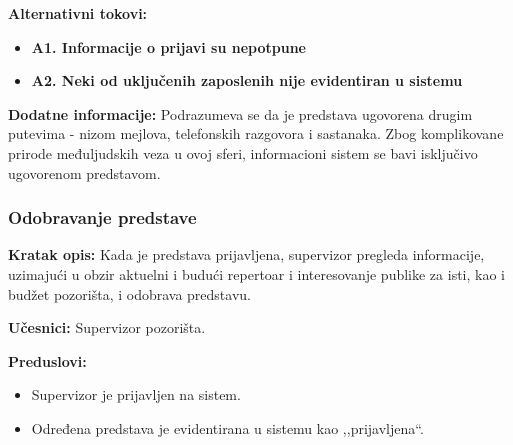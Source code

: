 \documentclass[a4paper]{article}
\begin{document}
\noindent\textbf{Alternativni tokovi:} 
\begin{itemize}
  \item \textbf{A1. Informacije o prijavi su nepotpune} 
  \item \textbf{A2. Neki od uključenih zaposlenih nije evidentiran u sistemu} 
\end{itemize}

\noindent\textbf{Dodatne informacije:} Podrazumeva se da je predstava ugovorena drugim putevima - nizom mejlova, telefonskih razgovora i sastanaka. Zbog komplikovane prirode međuljudskih veza u ovoj sferi, informacioni sistem se bavi isključivo ugovorenom predstavom. 

\subsubsection{Odobravanje predstave}
\noindent\textbf{Kratak opis:} Kada je predstava prijavljena, supervizor pregleda informacije, uzimajući u obzir aktuelni i budući repertoar i interesovanje publike za isti, kao i budžet pozorišta, i odobrava predstavu. 

\noindent\textbf{Učesnici:} Supervizor pozorišta.

\noindent\textbf{Preduslovi:}
  \begin{itemize}
    \item Supervizor je prijavljen na sistem.
    \item Određena predstava je evidentirana u sistemu kao ,,prijavljena``.
  \end{itemize}
\end{document}
